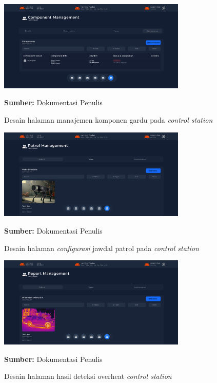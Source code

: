 \begin{figure}[H]
  \centering
  \includegraphics[width=0.8\textwidth]{gambar/bab3/component-ui.png}
  \caption{Desain halaman manajemen komponen gardu pada \emph{control station}}
  \label{fig:control-station-robot-patrol}
  \footnotesize{\textbf{Sumber:} Dokumentasi Penulis}
\end{figure}


\begin{figure}[H]
  \centering
  \includegraphics[width=0.8\textwidth]{gambar/bab3/patrol-m.png}
  \caption{Desain halaman \emph{configurasi} jawdal patrol pada \emph{control station}}
  \label{fig:control-station-robot-settinq}
  \footnotesize{\textbf{Sumber:} Dokumentasi Penulis}
\end{figure}


\begin{figure}[H]
  \centering
  \includegraphics[width=0.8\textwidth]{gambar/bab3/report.png}
  \caption{Desain halaman hasil deteksi overheat \emph{control station}}
  \label{fig:control-station-robot-feature}
  \footnotesize{\textbf{Sumber:} Dokumentasi Penulis}
\end{figure}


